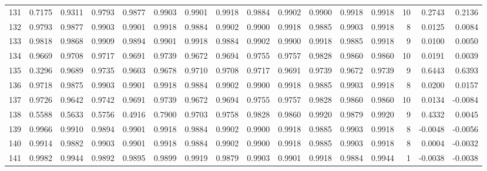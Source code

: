 \begin{tabular}{lrrrrrrrrrrrrrrr}
131 &      0.7175 &  0.9311 &  0.9793 &  0.9877 &  0.9903 &  0.9901 &  0.9918 &  0.9884 &  0.9902 &  0.9900 &   0.9918 &     0.9918 &     10 &                    0.2743 &                     0.2136 \\
132 &      0.9793 &  0.9877 &  0.9903 &  0.9901 &  0.9918 &  0.9884 &  0.9902 &  0.9900 &  0.9918 &  0.9885 &   0.9903 &     0.9918 &      8 &                    0.0125 &                     0.0084 \\
133 &      0.9818 &  0.9868 &  0.9909 &  0.9894 &  0.9901 &  0.9918 &  0.9884 &  0.9902 &  0.9900 &  0.9918 &   0.9885 &     0.9918 &      9 &                    0.0100 &                     0.0050 \\
134 &      0.9669 &  0.9708 &  0.9717 &  0.9691 &  0.9739 &  0.9672 &  0.9694 &  0.9755 &  0.9757 &  0.9828 &   0.9860 &     0.9860 &     10 &                    0.0191 &                     0.0039 \\
135 &      0.3296 &  0.9689 &  0.9735 &  0.9603 &  0.9678 &  0.9710 &  0.9708 &  0.9717 &  0.9691 &  0.9739 &   0.9672 &     0.9739 &      9 &                    0.6443 &                     0.6393 \\
136 &      0.9718 &  0.9875 &  0.9903 &  0.9901 &  0.9918 &  0.9884 &  0.9902 &  0.9900 &  0.9918 &  0.9885 &   0.9903 &     0.9918 &      8 &                    0.0200 &                     0.0157 \\
137 &      0.9726 &  0.9642 &  0.9742 &  0.9691 &  0.9739 &  0.9672 &  0.9694 &  0.9755 &  0.9757 &  0.9828 &   0.9860 &     0.9860 &     10 &                    0.0134 &                    -0.0084 \\
138 &      0.5588 &  0.5633 &  0.5756 &  0.4916 &  0.7900 &  0.9703 &  0.9758 &  0.9828 &  0.9860 &  0.9920 &   0.9879 &     0.9920 &      9 &                    0.4332 &                     0.0045 \\
139 &      0.9966 &  0.9910 &  0.9894 &  0.9901 &  0.9918 &  0.9884 &  0.9902 &  0.9900 &  0.9918 &  0.9885 &   0.9903 &     0.9918 &      8 &                   -0.0048 &                    -0.0056 \\
140 &      0.9914 &  0.9882 &  0.9903 &  0.9901 &  0.9918 &  0.9884 &  0.9902 &  0.9900 &  0.9918 &  0.9885 &   0.9903 &     0.9918 &      8 &                    0.0004 &                    -0.0032 \\
141 &      0.9982 &  0.9944 &  0.9892 &  0.9895 &  0.9899 &  0.9919 &  0.9879 &  0.9903 &  0.9901 &  0.9918 &   0.9884 &     0.9944 &      1 &                   -0.0038 &                    -0.0038 \\

\end{tabular}
